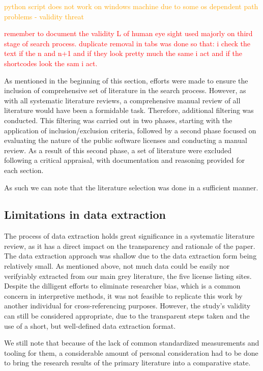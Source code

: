 \textcolor{orange}{python script does not work on windows machine due to some os dependent path problems - validity threat}

\textcolor{red}{remember to document the validity L of human eye sight used majorly on third stage of search process. duplicate removal in tabs was done so that: i check the text if the n and n+1 and if they look pretty much the same i act and if the shortcodes look the sam i act.}

As mentioned in the beginning of this section, efforts were made to ensure the inclusion of comprehensive set of literature in the search process. However, as with all systematic literature reviews, a comprehensive manual review of all literature would have been a formidable task. Therefore, additional filtering was conducted. This filtering was carried out in two phases, starting with the application of inclusion/exclusion criteria, followed by a second phase focused on evaluating the nature of the public software licenses and conducting a manual review. As a result of this second phase, a set of literature were excluded following a critical appraisal, with documentation and reasoning provided for each section.

As such we can note that the literature selection was done in a sufficient manner.

\subsection{Limitations in data extraction}
The process of data extraction holds great significance in a systematic literature review, as it has a direct impact on the transparency and rationale of the paper. The data extraction approach was shallow due to the data extraction form being relatively small. As mentioned above, not much data could be easily nor verifyiably extracted from our main grey literature, the five license listing sites. Despite the dilligent efforts to eliminate researcher bias, which is a common concern in interpretive methods, it was not feasible to replicate this work by another individual for cross-referencing purposes. However, the study's validity can still be considered appropriate, due to the transparent steps taken and the use of a short, but well-defined data extraction format.

We still note that because of the lack of common standardized measurements and tooling for them, a considerable amount of personal consideration had to be done to bring the research results of the primary literature into a comparative state.